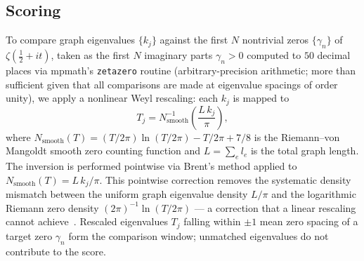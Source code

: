 \documentclass[cntp]{ipart}
\theoremstyle{plain}
\theoremstyle{remark}
\begin{document}
\subsection{Scoring}
\label{sec:methods-scoring}

To compare graph eigenvalues $\{k_j\}$ against the first $N$ nontrivial zeros $\{\gamma_n\}$ of $\zeta(\tfrac{1}{2} + it)$, taken as the first $N$ imaginary parts $\gamma_n > 0$ computed to $50$ decimal places via mpmath's \texttt{zetazero} routine (arbitrary-precision arithmetic; more than sufficient given that all comparisons are made at eigenvalue spacings of order unity), we apply a nonlinear Weyl rescaling: each $k_j$ is mapped to
\begin{equation}
    T_j = N_{\mathrm{smooth}}^{-1}\!\left(\frac{L\,k_j}{\pi}\right),
\end{equation}
where $N_{\mathrm{smooth}}(T) = (T/2\pi)\ln(T/2\pi) - T/2\pi + 7/8$ is the Riemann--von Mangoldt smooth zero counting function and $L = \sum_e l_e$ is the total graph length. The inversion is performed pointwise via Brent's method applied to $N_{\mathrm{smooth}}(T) = L\,k_j/\pi$. This pointwise correction removes the systematic density mismatch between the uniform graph eigenvalue density $L/\pi$ and the logarithmic Riemann zero density $(2\pi)^{-1}\ln(T/2\pi)$ --- a correction that a linear rescaling cannot achieve~\cite{r8}. Rescaled eigenvalues $T_j$ falling within $\pm 1$ mean zero spacing of a target zero $\gamma_n$ form the comparison window; unmatched eigenvalues do not contribute to the score.
\end{document}
